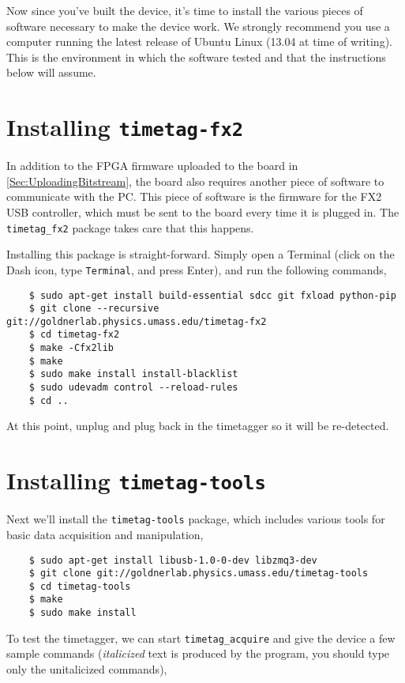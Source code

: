Now since you've built the device, it's time to install the various
pieces of software necessary to make the device work. We strongly
recommend you use a computer running the latest release of Ubuntu
Linux (13.04 at time of writing). This is the environment in which the
software tested and that the instructions below will assume.

\section{Installing {\tt timetag-fx2}}
In addition to the FPGA firmware uploaded to the board in
\ref{Sec:UploadingBitstream}, the board also requires another piece of
software to communicate with the PC. This piece of software is the
firmware for the FX2 USB controller, which must be sent to the board
every time it is plugged in. The {\tt timetag\_fx2} package takes care
that this happens.

Installing this package is straight-forward. Simply open a Terminal
(click on the Dash icon, type {\tt Terminal}, and press Enter), and
run the following commands,

\begin{verbatim}
    $ sudo apt-get install build-essential sdcc git fxload python-pip
    $ git clone --recursive git://goldnerlab.physics.umass.edu/timetag-fx2
    $ cd timetag-fx2
    $ make -Cfx2lib
    $ make
    $ sudo make install install-blacklist
    $ sudo udevadm control --reload-rules
    $ cd ..
\end{verbatim}

At this point, unplug and plug back in the timetagger so it will be
re-detected.

\section{Installing {\tt timetag-tools}}

Next we'll install the {\tt timetag-tools} package, which includes
various tools for basic data acquisition and manipulation,

\begin{verbatim}
    $ sudo apt-get install libusb-1.0-0-dev libzmq3-dev
    $ git clone git://goldnerlab.physics.umass.edu/timetag-tools
    $ cd timetag-tools
    $ make
    $ sudo make install
\end{verbatim}

To test the timetagger, we can start {\tt timetag\_acquire} and give
the device a few sample commands ({\it italicized} text is produced by
the program, you should type only the unitalicized commands),

